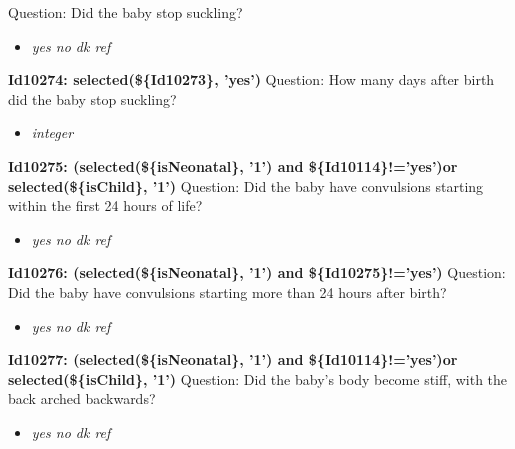 \documentclass{article}%
\begin{document}
Question: Did the baby stop suckling?\newline%
%
\begin{itemize}%
\item%
\textit{yes\newline%
 no\newline%
 dk\newline%
 ref\newline%
}%
\end{itemize}%
\textbf{Id10274: selected(\$\{Id10273\}, 'yes')\newline%
}%
Question: How many days after birth did the baby stop suckling?\newline%
%
\begin{itemize}%
\item%
\textit{integer\newline%
}%
\end{itemize}%
\textbf{Id10275: (selected(\$\{isNeonatal\}, '1') and \$\{Id10114\}!='yes')or selected(\$\{isChild\}, '1')\newline%
}%
Question: Did the baby have convulsions starting within the first 24 hours of life?\newline%
%
\begin{itemize}%
\item%
\textit{yes\newline%
 no\newline%
 dk\newline%
 ref\newline%
}%
\end{itemize}%
\textbf{Id10276: (selected(\$\{isNeonatal\}, '1') and \$\{Id10275\}!='yes')\newline%
}%
Question: Did the baby have convulsions starting more than 24 hours after birth?\newline%
%
\begin{itemize}%
\item%
\textit{yes\newline%
 no\newline%
 dk\newline%
 ref\newline%
}%
\end{itemize}%
\textbf{Id10277: (selected(\$\{isNeonatal\}, '1') and \$\{Id10114\}!='yes')or selected(\$\{isChild\}, '1')\newline%
}%
Question: Did the baby's body become stiff, with the back arched backwards?\newline%
%
\begin{itemize}%
\item%
\textit{yes\newline%
 no\newline%
 dk\newline%
 ref\newline%
}%
\end{itemize}%
\end{document}
